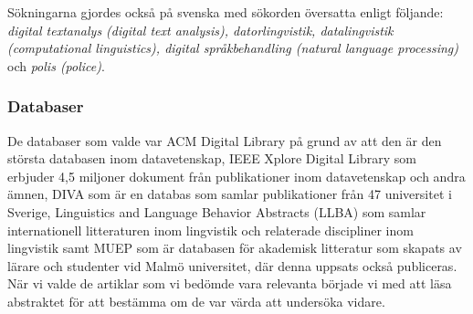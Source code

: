 \documentclass[swedish]{maucsthesis}
\begin{document}
Sökningarna gjordes också på svenska med sökorden översatta enligt följande: \textit
{digital textanalys (digital text analysis), datorlingvistik, datalingvistik
(computational linguistics), digital språkbehandling (natural language processing)} och
\textit {polis (police)}.

\subsubsection{Databaser}

De databaser som valde var ACM Digital Library på grund av att den är den
största databasen inom datavetenskap, IEEE Xplore Digital Library som erbjuder
4,5 miljoner dokument från publikationer inom datavetenskap och andra ämnen,
DIVA som är en databas som samlar publikationer från 47 universitet i Sverige,
Linguistics and Language Behavior Abstracts (LLBA) som samlar internationell
litteraturen inom lingvistik och relaterade discipliner inom lingvistik samt
MUEP som är databasen för akademisk litteratur som skapats av lärare och
studenter vid Malmö universitet, där denna uppsats också publiceras. När vi
valde de artiklar som vi bedömde vara relevanta började vi med att läsa abstraktet
för att bestämma om de var värda att undersöka vidare.
\end{document}
